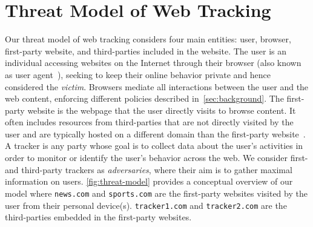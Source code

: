 \section{Threat Model of Web Tracking}
\label{sec:threat-model}
\vspace{-1mm}

Our threat model of web tracking considers four main entities: user, browser, first-party website, and third-parties included in the website. 
%
The user is an individual accessing websites on the Internet through their browser (also known as user agent~\cite{mdnUserAgentMDN2025}), seeking to keep their online behavior private and hence considered the \textit{victim}. %
%
Browsers mediate all interactions between the user and the web content, enforcing different policies described in~\autoref{sec:background}. %
%
The first-party website is the webpage that the user directly visits to browse content. 
%
It often includes resources from third-parties that are not directly visited by the user and are typically hosted on a different domain than the first-party website~\cite{mdnDomainMDNWeb2024}.
%
A tracker is any party whose goal is to collect data about the user’s activities in order to monitor or identify the user’s behavior across the web. %
%
We consider first- and third-party trackers as \textit{adversaries}, where their aim is to gather maximal information on users. %
%
\autoref{fig:threat-model} provides a conceptual overview of our model where \texttt{news.com} and \texttt{sports.com} are the first-party websites visited by the user from their personal device(s). 
%
\texttt{tracker1.com} and \texttt{tracker2.com} are the third-parties embedded in the first-party websites.



